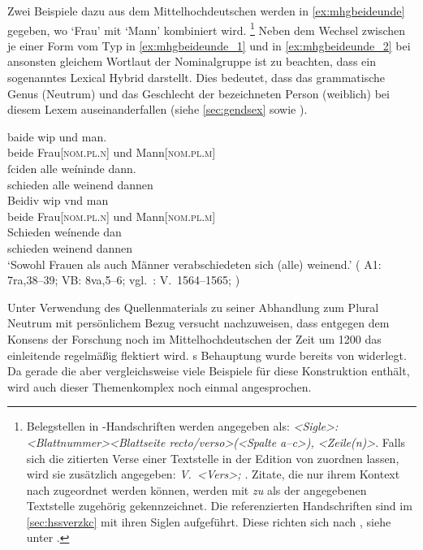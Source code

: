 Zwei Beispiele dazu aus dem Mittelhochdeutschen werden in
\cref{ex:mhgbeideunde} gegeben, wo  `Frau' mit 
`Mann' kombiniert wird.%
%
	\footnote{Belegstellen in \KC{}-Handschriften werden angegeben als:
		\textit{<Sigle>: <Blattnummer><Blattseite recto/verso>(<Spalte a--c>),%
		<Zeile(n)>}. Falls sich die zitierten Verse einer Textstelle in der
		Edition von \citet{schroeder1895} zuordnen lassen, wird sie zusätzlich
		angegeben: \textit{V.~<Vers>; \cite[vgl.
		(abweichend)][<Seite>]{schroeder1895}}. Zitate, die nur ihrem Kontext
		nach zugeordnet werden können, werden mit \textit{zu} als der
		angegebenen Textstelle zugehörig gekennzeichnet. Die referenzierten
		Handschriften sind im \cref{sec:hssverzkc} mit ihren Siglen aufgeführt.
		Diese richten sich nach , siehe unter
		\nocite{kcdigital}.%
	}
%
Neben dem Wechsel zwischen je einer Form vom Typ  in
\cref{ex:mhgbeideunde_1} und  in \cref{ex:mhgbeideunde_2} bei
ansonsten gleichem Wortlaut der Nominalgruppe ist zu beachten, dass 
ein sogenanntes Lexical Hybrid darstellt. Dies bedeutet, dass das grammatische
Genus (Neutrum) und das Geschlecht der bezeichneten Person (weiblich) bei
diesem Lexem auseinanderfallen (siehe \cref{sec:gendsex} sowie
\cite[183--184]{corbett1991}).

\begin{exe}
\ex \label{ex:mhgbeideunde}
	\begin{xlist}
	\ex \label{ex:mhgbeideunde_1}
		\gll baide wip und man. \\
			beide Frau[\textsc{nom.pl.n}] und Mann[\textsc{nom.pl.m}] \\
	\sn \gll ſciden alle weíninde dann. \\
			schieden alle weinend dannen \\

	\ex \label{ex:mhgbeideunde_2}
		\gll Beidiv wip vnd man \\
			beide Frau[\textsc{nom.pl.n}] und Mann[\textsc{nom.pl.m}] \\
	\sn \gll Schieden weínende dan \\
			schieden weinend dannen \\
		\trans `Sowohl Frauen als auch Männer verabschiedeten sich (alle)
			weinend.'
			(%
				A1: 7ra,38--39;
				VB: 8va,5--6;
				vgl.~\KC: V.~1564--1565; \cite[110]{schroeder1895}%
			)
	\end{xlist}
\end{exe}

Unter Verwendung des Quellenmaterials zu seiner Abhandlung zum Plural Neutrum
mit persönlichem Bezug \autocite{askedal1973} versucht \citet{askedal1974}
nachzuweisen, dass entgegen dem Konsens der Forschung
\autocites[vgl.~z.\,B.][433]{behaghel1923}[133]{dal2014}[626]{ksw2} noch im
Mittelhochdeutschen der Zeit um 1200 das einleitende  regelmäßig
flektiert wird. \citeauthor{askedal1974}s Behauptung wurde bereits von
\citet{gjelsten1980} widerlegt. Da gerade die \KC{} aber vergleichsweise
viele Beispiele für diese Konstruktion enthält, wird auch dieser Themenkomplex
noch einmal angesprochen.

